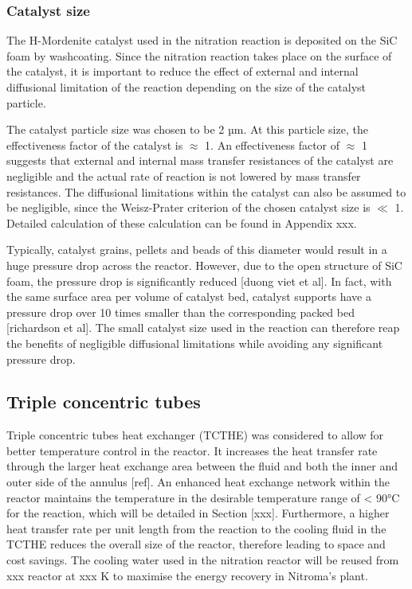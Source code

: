 \subsubsection{Catalyst size}
The H-Mordenite catalyst used in the nitration reaction is deposited on the SiC foam by washcoating. Since the nitration reaction takes place on the surface of the catalyst, it is important to reduce the effect of external and internal diffusional limitation of the reaction depending on the size of the catalyst particle.  

The catalyst particle size was chosen to be 2 µm. At this particle size, the effectiveness factor of the catalyst is $\approx$ 1. An effectiveness factor of $\approx$ 1 suggests that external and internal mass transfer resistances of the catalyst are negligible and the actual rate of reaction is not lowered by mass transfer resistances. The diffusional limitations within the catalyst can also be assumed to be negligible, since the Weisz-Prater criterion of the chosen catalyst size is $\ll$ 1. Detailed calculation of these calculation can be found in Appendix xxx.

Typically, catalyst grains, pellets and beads of this diameter would result in a huge pressure drop across the reactor. However, due to the open structure of SiC foam, the pressure drop is significantly reduced [duong viet et al]. In fact, with the same surface area per volume of catalyst bed, catalyst supports have a pressure drop over 10 times smaller than the corresponding packed bed [richardson et al]. The small catalyst size used in the reaction can therefore reap the benefits of negligible diffusional limitations while avoiding any significant pressure drop.

\subsection{Triple concentric tubes}
Triple concentric tubes heat exchanger (TCTHE) was considered to allow for better temperature control in the reactor. It increases the heat transfer rate through the larger heat exchange area between the fluid and both the inner and outer side of the annulus [ref]. An enhanced heat exchange network within the reactor maintains the temperature in the desirable temperature range of < 90°C for the reaction, which will be detailed in Section [xxx]. Furthermore, a higher heat transfer rate per unit length from the reaction to the cooling fluid in the TCTHE reduces the overall size of the reactor, therefore leading to space and cost savings. The cooling water used in the nitration reactor will be reused from xxx reactor at xxx K to maximise the energy recovery in Nitroma's plant. 

